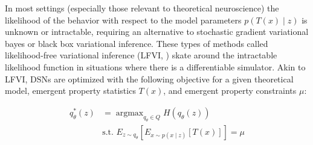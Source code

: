 \documentclass[11pt]{article}
\DeclareMathOperator*{\argmax}{argmax}
\begin{document}
In most settings (especially those relevant to theoretical neuroscience) the likelihood of the behavior with respect to the model parameters $p(T(x) \mid z)$ is unknown or intractable, requiring an alternative to stochastic gradient variational bayes \cite{kingma2013auto} or black box variational inference\cite{ranganath2014black}.  These types of methods called likelihood-free variational inference (LFVI, \cite{tran2017hierarchical}) skate around the intractable likelihood function in situations where there is a differentiable simulator. Akin to LFVI, DSNs are optimized with the following objective for a given theoretical model, emergent property statistics $T(x)$, and emergent property constraints $\mu$:

\begin{equation}
\begin{split}
q_\theta^*(z) &= \argmax_{q_\theta \in Q} H(q_\theta(z)) \\
 &  \text{s.t.  } E_{z \sim q_\theta}\left[ E_{x\sim p(x \mid z)}\left[T(x)\right] \right] = \mu \\
 \end{split}
\end{equation}
\end{document}
